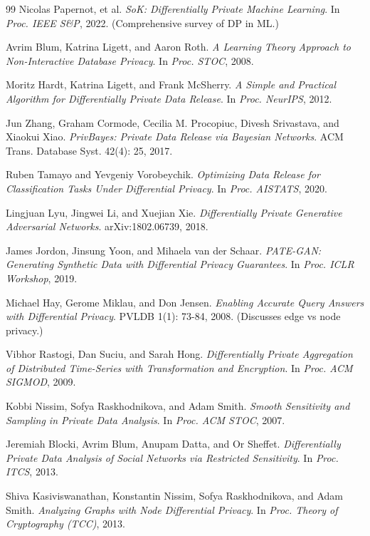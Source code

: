 \documentclass[11pt]{article}
\theoremstyle{remark}
\theoremstyle{definition}
\theoremstyle{plain}
\begin{document}
\begin{thebibliography}{99}
 Nicolas Papernot, et al. \textit{SoK: Differentially Private Machine Learning}. In \textit{Proc. IEEE S\&P}, 2022. (Comprehensive survey of DP in ML.)

 Avrim Blum, Katrina Ligett, and Aaron Roth. \textit{A Learning Theory Approach to Non-Interactive Database Privacy}. In \textit{Proc. STOC}, 2008.

 Moritz Hardt, Katrina Ligett, and Frank McSherry. \textit{A Simple and Practical Algorithm for Differentially Private Data Release}. In \textit{Proc. NeurIPS}, 2012.

 Jun Zhang, Graham Cormode, Cecilia M. Procopiuc, Divesh Srivastava, and Xiaokui Xiao. \textit{PrivBayes: Private Data Release via Bayesian Networks}. ACM Trans. Database Syst. 42(4): 25, 2017.

 Ruben Tamayo and Yevgeniy Vorobeychik. \textit{Optimizing Data Release for Classification Tasks Under Differential Privacy}. In \textit{Proc. AISTATS}, 2020.

 Lingjuan Lyu, Jingwei Li, and Xuejian Xie. \textit{Differentially Private Generative Adversarial Networks}. arXiv:1802.06739, 2018.

 James Jordon, Jinsung Yoon, and Mihaela van der Schaar. \textit{PATE-GAN: Generating Synthetic Data with Differential Privacy Guarantees}. In \textit{Proc. ICLR Workshop}, 2019.

 Michael Hay, Gerome Miklau, and Don Jensen. \textit{Enabling Accurate Query Answers with Differential Privacy}. PVLDB 1(1): 73-84, 2008. (Discusses edge vs node privacy.)

 Vibhor Rastogi, Dan Suciu, and Sarah Hong. \textit{Differentially Private Aggregation of Distributed Time-Series with Transformation and Encryption}. In \textit{Proc. ACM SIGMOD}, 2009.

 Kobbi Nissim, Sofya Raskhodnikova, and Adam Smith. \textit{Smooth Sensitivity and Sampling in Private Data Analysis}. In \textit{Proc. ACM STOC}, 2007.

 Jeremiah Blocki, Avrim Blum, Anupam Datta, and Or Sheffet. \textit{Differentially Private Data Analysis of Social Networks via Restricted Sensitivity}. In \textit{Proc. ITCS}, 2013.

 Shiva Kasiviswanathan, Konstantin Nissim, Sofya Raskhodnikova, and Adam Smith. \textit{Analyzing Graphs with Node Differential Privacy}. In \textit{Proc. Theory of Cryptography (TCC)}, 2013.


\end{thebibliography}
\end{document}
